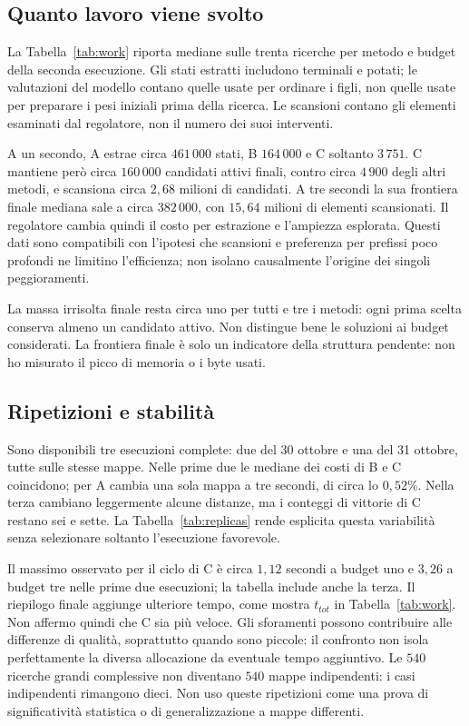 \subsection{Quanto lavoro viene svolto}
La Tabella~\ref{tab:work} riporta mediane sulle trenta ricerche per metodo e
budget della seconda esecuzione. Gli stati estratti includono terminali e
potati; le valutazioni del modello contano quelle usate per ordinare i figli,
non quelle usate per preparare i pesi iniziali prima della ricerca. Le scansioni contano gli elementi
esaminati dal regolatore, non il numero dei suoi interventi.


A un secondo, A estrae circa $461\,000$ stati, B $164\,000$ e C soltanto
$3\,751$. C mantiene però circa $160\,000$ candidati attivi finali, contro
circa $4\,900$ degli altri metodi, e scansiona circa $2{,}68$ milioni di
candidati. A tre secondi la sua frontiera finale mediana sale a circa
$382\,000$, con $15{,}64$ milioni di elementi scansionati.
Il regolatore cambia quindi il costo per estrazione e l'ampiezza esplorata.
Questi dati sono compatibili con l'ipotesi che scansioni e preferenza per
prefissi poco profondi ne limitino l'efficienza; non isolano causalmente
l'origine dei singoli peggioramenti.

La massa irrisolta finale resta circa uno per tutti e tre i metodi: ogni
prima scelta conserva almeno un candidato attivo. Non distingue bene le
soluzioni ai budget considerati. La frontiera finale è solo un indicatore
della struttura pendente: non ho misurato il picco di memoria o i byte usati.

\subsection{Ripetizioni e stabilità}
Sono disponibili tre esecuzioni complete: due del 30 ottobre e una del
31 ottobre, tutte sulle stesse mappe. Nelle prime due le mediane dei costi
di B e C coincidono; per A cambia una sola mappa a tre secondi, di circa
lo $0{,}52\%$. Nella terza cambiano leggermente alcune distanze, ma i conteggi
di vittorie di C restano sei e sette. La Tabella~\ref{tab:replicas} rende
esplicita questa variabilità senza selezionare soltanto l'esecuzione favorevole.


Il massimo osservato per il ciclo di C è circa $1{,}12$ secondi a budget uno
e $3{,}26$ a budget tre nelle prime due esecuzioni; la tabella include anche
la terza. Il riepilogo finale aggiunge ulteriore tempo, come mostra $t_{tot}$
in Tabella~\ref{tab:work}. Non affermo quindi che C sia più veloce. Gli sforamenti possono contribuire
alle differenze di qualità, soprattutto quando sono piccole: il confronto
non isola perfettamente la diversa allocazione da eventuale tempo aggiuntivo.
Le $540$ ricerche grandi complessive non diventano $540$ mappe indipendenti:
i casi indipendenti rimangono dieci. Non uso queste ripetizioni come una
prova di significatività statistica o di generalizzazione a mappe differenti.

